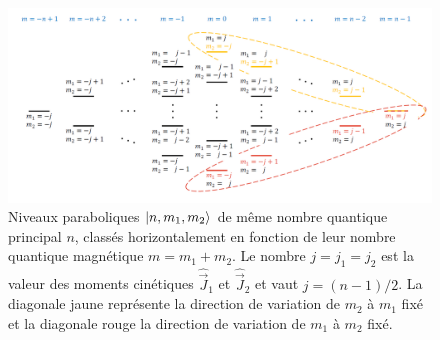 \begin{figure}[!h]
\centering
\includegraphics[width=1.\linewidth]{figures/theory/echelle_parabolique_m1m2}
\caption[Échelle des niveaux paraboliques $\ket{n,m_1,m_2}$]{
Niveaux paraboliques $\ket{n,m_1,m_2}$ de même nombre quantique principal $n$, classés horizontalement en fonction de leur nombre quantique magnétique $m=m_1+m_2$. Le nombre $j=j_1=j_2$ est la valeur des moments cinétiques $\hat{\vec{J}}_1$ et $\hat{\vec{J}}_2$ et vaut $j=(n-1)/2$.
La diagonale jaune représente la direction de variation de $m_2$ à $m_1$ fixé et la diagonale rouge la direction de variation de $m_1$ à $m_2$ fixé.
}
\label{fig:parab_m1m2}
\end{figure}



